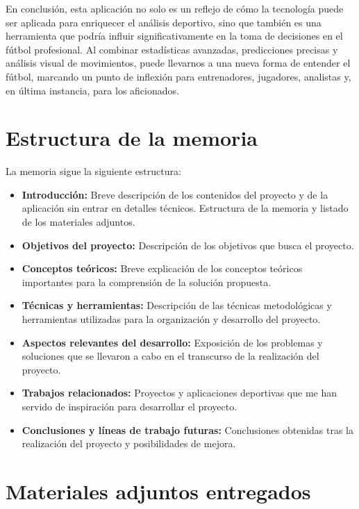 En conclusión, esta aplicación no solo es un reflejo de cómo la tecnología puede ser aplicada para enriquecer el análisis deportivo, sino que también es una herramienta que podría influir significativamente en la toma de decisiones en el fútbol profesional. Al combinar estadísticas avanzadas, predicciones precisas y análisis visual de movimientos, puede llevarnos a una nueva forma de entender el fútbol, marcando un punto de inflexión para entrenadores, jugadores, analistas y, en última instancia, para los aficionados. \\


\section{Estructura de la memoria}

La memoria sigue la siguiente estructura:

\begin{itemize}
    \item \textbf{Introducción:} Breve descripción de los contenidos del proyecto y de la aplicación sin entrar en detalles técnicos. Estructura de la memoria y listado de los materiales adjuntos.
    \item \textbf{Objetivos del proyecto:} Descripción de los objetivos que busca el proyecto.
    \item \textbf{Conceptos teóricos:} Breve explicación de los conceptos teóricos importantes para la comprensión de la solución propuesta.
    \item \textbf{Técnicas y herramientas:} Descripción de las técnicas metodológicas y herramientas utilizadas para la organización y desarrollo del proyecto.
    \item \textbf{Aspectos relevantes del desarrollo:} Exposición de los problemas y soluciones que se llevaron a cabo en el transcurso de la realización del proyecto.
    \item \textbf{Trabajos relacionados:} Proyectos y aplicaciones deportivas que me han servido de inspiración para desarrollar el proyecto.
    \item \textbf{Conclusiones y líneas de trabajo futuras:} Conclusiones obtenidas tras la realización del proyecto y posibilidades de mejora.
\end{itemize}

\section{Materiales adjuntos entregados}

